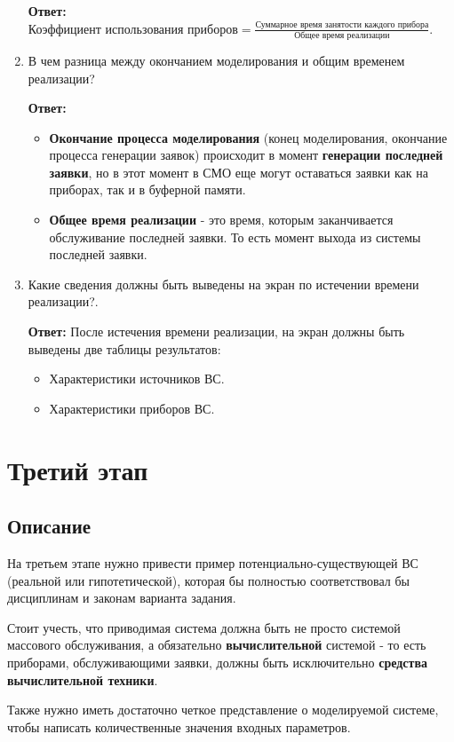 \documentclass[a4paper, 14pt]{article}
\begin{document}
\begin{enumerate}
	      \textbf{Ответ:} $\text{Коэффициент использования приборов} = \frac{\text{Суммарное время занятости каждого прибора}}{\text{Общее время реализации}}$.
	\item В чем разница между окончанием моделирования и общим временем реализации?

	      \textbf{Ответ:}
	      \begin{itemize}
		      \item \textbf{Окончание процесса моделирования} (конец моделирования, окончание процесса генерации заявок) происходит в момент \textbf{генерации последней заявки}, но в этот момент в СМО еще могут оставаться заявки как на приборах, так и в буферной памяти.
		      \item \textbf{Общее время реализации} - это время, которым заканчивается обслуживание последней заявки. То есть момент выхода из системы последней заявки.
	      \end{itemize}
	\item Какие сведения должны быть выведены на экран по истечении времени реализации?.

	      \textbf{Ответ:} После истечения времени реализации, на экран должны быть выведены две таблицы результатов:
	      \begin{itemize}
		      \item Характеристики источников ВС.
		      \item Характеристики приборов ВС.
	      \end{itemize}
\end{enumerate}

\section{Третий этап}

\subsection{Описание}

На третьем этапе нужно привести пример потенциально-существующей ВС (реальной или гипотетической), которая бы полностью соответствовал бы дисциплинам и законам варианта задания.

Стоит учесть, что приводимая система должна быть не просто системой массового обслуживания, а обязательно \textbf{вычислительной} системой - то есть приборами, обслуживающими заявки, должны быть исключительно \textbf{средства вычислительной техники}.

Также нужно иметь достаточно четкое представление о моделируемой системе, чтобы написать количественные значения входных параметров.
\end{document}
